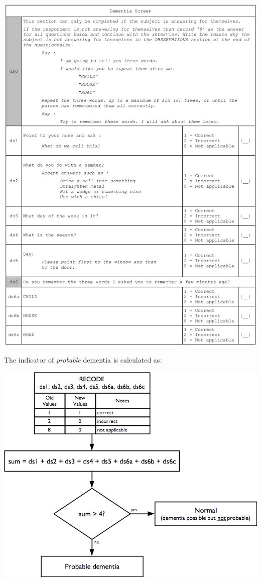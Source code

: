 \documentclass[12pt,a4paper]{book}
\theoremstyle{definition}
\theoremstyle{definition}
\theoremstyle{definition}
\theoremstyle{remark}
\begin{document}
\begin{center}\includegraphics[width=23.94in]{figures/questionnaire07} \end{center}

\newpage

The indicator of \emph{probable} dementia is calculated as:

\begin{center}\includegraphics[width=9.76in]{figures/indicators20} \end{center}
\end{document}
